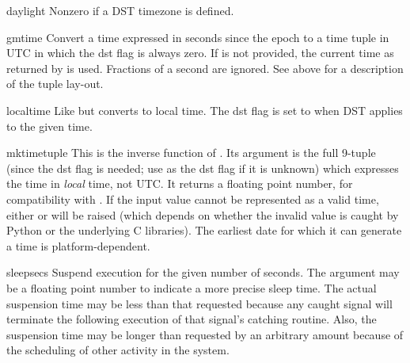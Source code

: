 \begin{datadesc}{daylight}
Nonzero if a DST timezone is defined.
\end{datadesc}

\begin{funcdesc}{gmtime}{}
Convert a time expressed in seconds since the epoch to a time tuple
in UTC in which the dst flag is always zero.  If  is not
provided, the current time as returned by  is used.
Fractions of a second are ignored.  See above for a description of the
tuple lay-out.
\end{funcdesc}

\begin{funcdesc}{localtime}{}
Like  but converts to local time.  The dst flag is
set to  when DST applies to the given time.
\end{funcdesc}

\begin{funcdesc}{mktime}{tuple}
This is the inverse function of .  Its argument
is the full 9-tuple (since the dst flag is needed; use  as
the dst flag if it is unknown) which expresses the time in
\emph{local} time, not UTC.  It returns a floating point number, for
compatibility with .  If the input value cannot be
represented as a valid time, either  or
 will be raised (which depends on whether the
invalid value is caught by Python or the underlying C libraries).  The
earliest date for which it can generate a time is platform-dependent.
\end{funcdesc}

\begin{funcdesc}{sleep}{secs}
Suspend execution for the given number of seconds.  The argument may
be a floating point number to indicate a more precise sleep time.
The actual suspension time may be less than that requested because any
caught signal will terminate the  following
execution of that signal's catching routine.  Also, the suspension
time may be longer than requested by an arbitrary amount because of
the scheduling of other activity in the system.
\end{funcdesc}

